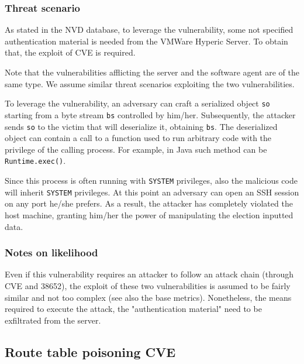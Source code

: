 \subsubsection*{Threat scenario}

As stated in the NVD database\cite{online:cve-2022-38652}, to leverage the vulnerability, some not specified authentication material is needed from the VMWare Hyperic Server. To obtain that, the exploit of CVE is required.

Note that the vulnerabilities afflicting the server and the software agent are of the same type\cite{online:cve-2022-38650}. We assume similar threat scenarios exploiting the two vulnerabilities.

To leverage the vulnerability, an adversary can craft a serialized object \texttt{so} starting from a byte stream \texttt{bs} controlled by him/her. Subsequently, the attacker sends \texttt{so} to the victim that will deserialize it, obtaining \texttt{bs}. The deserialized object can contain a call to a function used to run arbitrary code with the privilege of the calling process\cite{artile:Java_Deserialization_Remote-Code_Execution}. For example, in Java such method can be \texttt{Runtime.exec()}.

Since this process is often running with \texttt{SYSTEM} privileges\cite{online:cve-2022-38652}, also the malicious code will inherit \texttt{SYSTEM} privileges. At this point an adversary can open an SSH session on any port he/she prefers. As a result, the attacker has completely violated the host machine, granting him/her the power of manipulating the election inputted data.

\subsubsection*{Notes on likelihood}

Even if this vulnerability requires an attacker to follow an attack chain (through CVE and 38652), the exploit of these two vulnerabilities is assumed to be fairly similar and not too complex (see also the base metrics). Nonetheless, the means required to execute the attack, the "authentication material" need to be exfiltrated from the server.

\subsection*{Route table poisoning \- CVE}

